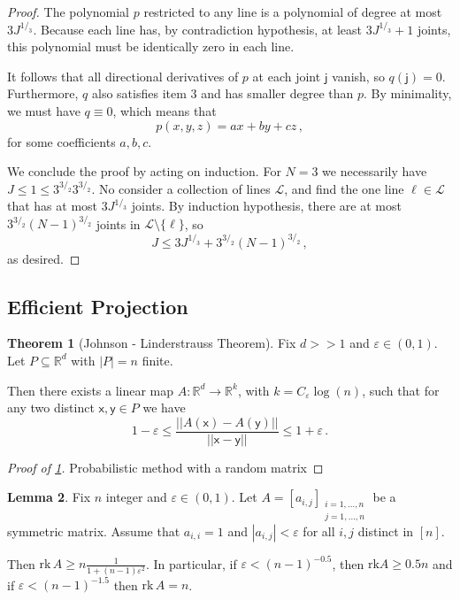 \documentclass[12pt]{amsart}
\theoremstyle{definition}
\newtheorem{thm}{Theorem}[section]
\newtheorem{lm}[thm]{Lemma}
\newcommand{\R}{\mathbb{R}}
\newcommand{\vj}{\mathsf{j}}
\newcommand{\vx}{\mathsf{x}}
\newcommand{\vy}{\mathsf{y}}
\newcommand{\rk}{\mathrm{rk}}
\begin{document}
\begin{proof}
The polynomial $p$ restricted to any line is a polynomial of degree at most $3J^{1/_3}$.
Because each line has, by contradiction hypothesis, at least $3 J^{1/_3} + 1$ joints, this polynomial must be identically zero in each line.

It follows that all directional derivatives of $p$ at each joint $\vj$ vanish, so $q(\vj) = 0$.
Furthermore, $q$ also satisfies item 3 and has smaller degree than $p$.
By minimality, we must have $q \equiv 0$, which means that 
$$ p(x, y, z ) = ax +by + cz \, ,$$
for some coefficients $a, b, c$.


We conclude the proof by acting on induction. For $N = 3$ we necessarily have $J\leq 1 \leq 3^{3/_2} 3^{3/_2}$.
No consider a collection of lines $\mathcal L$, and find the one line $\ell \in \mathcal L$ that has at most $3 J^{1/_3}$ joints.
By induction hypothesis, there are at most $3^{3/_2} (N-1)^{3/_2}$ joints in $\mathcal L \setminus \{\ell \}$, so 
$$ J \leq 3 J^{1/_3} + 3^{3/_2} (N-1)^{3/_2}\, , $$
as desired.
\end{proof}


\subsection{Efficient Projection}




\begin{thm}[Johnson - Linderstrauss Theorem]\label{thm:JL}
Fix $d >> 1$ and $\varepsilon \in (0, 1)$.
Let $P \subseteq \R^d$ with $|P| = n$ finite.

Then there exists a linear map $A:\R^d \to \R^k$, with $k = C_{\varepsilon} \log (n)$, such that for any two distinct $\vx, \vy \in P$ we have
$$ 1 - \varepsilon \leq \frac{||A(\vx) - A(\vy)||}{||\vx - \vy||} \leq 1 + \varepsilon \, . $$
\end{thm}

\begin{proof}[Proof of \cref{thm:JL}]%
Probabilistic method with a random matrix
\end{proof}

\begin{lm}\label{lm:JL_1}
Fix $n$ integer and $\varepsilon \in (0, 1)$.
Let $A = [a_{i, j}]_{\substack{i = 1, \ldots , n \\ j = 1, \ldots , n}}$ be a symmetric matrix.
Assume that $a_{i, i} = 1$ and $|a_{i, j}| < \varepsilon $ for all $i, j$ distinct in $[n]$.

Then $\rk \,A \geq n \frac{1}{1 + (n-1)\varepsilon^2}$.
In particular, if $\varepsilon < (n-1)^{-0.5}$, then $\rk A \geq 0.5 n$ and if $\varepsilon < (n-1)^{-1.5}$ then $\rk \,A = n$.
\end{lm}
\end{document}
